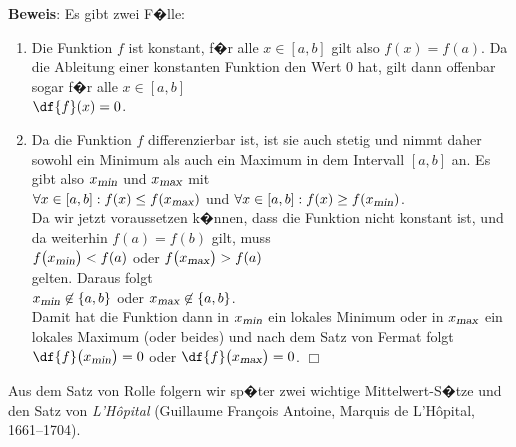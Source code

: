 \noindent
\textbf{Beweis}: Es gibt zwei
F�lle:
\begin{enumerate}
\item Die Funktion $f$ ist konstant, f�r alle $x\in[a,b]$ gilt also $f(x) = f(a)$.
      Da die Ableitung einer konstanten Funktion den Wert $0$ hat, gilt dann offenbar sogar f�r alle $x\in[a,b]$ 
      \\[0.3cm]
      \hspace*{1.3cm} $\df{f}(x) = 0$.
\item Da die Funktion $f$ differenzierbar ist, ist sie auch stetig und nimmt
      daher sowohl ein Minimum als auch ein Maximum in dem Intervall $[a,b]$ an.  
      Es gibt also  $x_{\textsl{\footnotesize min}}$ und  $x_{\textsl{\footnotesize max}}$
      mit
      \\[0.2cm]
      \hspace*{1.3cm}
      $\forall x \in [a,b]: f(x) \leq f(x_{\textsl{\footnotesize max}})$ \quad und \quad $\forall x \in [a,b]: f(x) \geq f(x_{\textsl{\footnotesize min}})$.
      \\[0.2cm]
      Da wir jetzt voraussetzen k�nnen, dass die Funktion nicht konstant ist, und da
      weiterhin $f(a) = f(b)$ gilt, muss 
      \\[0.2cm]
      \hspace*{1.3cm}
      $f\bigl(x_{\textsl{\footnotesize min}}\bigr) < f(a)$ \quad  oder \quad
      $f\bigl(x_{\textsl{\footnotesize max}}\bigr) > f(a)$
      \\[0.2cm]
      gelten.  Daraus folgt 
      \\[0.2cm]
      \hspace*{1.3cm}
      $x_{\textsl{\footnotesize min}}\not\in \{a,b\}$ \quad  oder \quad $x_{\textsl{\footnotesize max}}\not\in \{a,b\}$.
      \\[0.2cm]
      Damit hat die Funktion dann in $x_{\textsl{\footnotesize min}}$ ein
      lokales Minimum oder in $x_{\textsl{\footnotesize max}}$ ein lokales
      Maximum (oder beides) und nach dem Satz von Fermat folgt 
      \\[0.3cm]
      \hspace*{1.3cm}
      $\df{f}\bigl(x_{\textsl{\footnotesize min}}\bigr) = 0$ \quad  oder \quad $\df{f}\bigl(x_{\textsl{\footnotesize max}}\bigr) = 0$.
      \hspace*{\fill} $\Box$
\end{enumerate}
Aus dem Satz von Rolle folgern wir sp�ter zwei wichtige Mittelwert-S�tze und den Satz von 
\textsl{L'H\^opital} (Guillaume Fran\c{c}ois Antoine, Marquis de L'H\^opital, 1661--1704).

